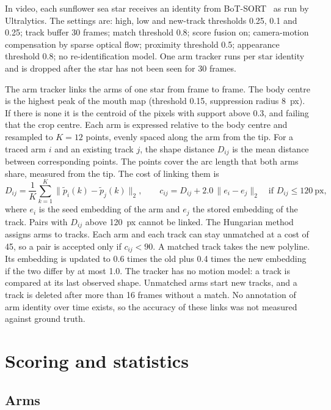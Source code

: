 In video, each sunflower sea star receives an identity from BoT-SORT~\cite{aharon2022botsort} as run by Ultralytics.
The settings are: high, low and new-track thresholds 0.25, 0.1 and 0.25; track buffer 30 frames; match threshold 0.8; score fusion on; camera-motion compensation by sparse optical flow; proximity threshold 0.5; appearance threshold 0.8; no re-identification model.
One arm tracker runs per star identity and is dropped after the star has not been seen for 30 frames.

The arm tracker links the arms of one star from frame to frame.
The body centre is the highest peak of the mouth map (threshold 0.15, suppression radius 8~px).
If there is none it is the centroid of the pixels with support above 0.3, and failing that the crop centre.
Each arm is expressed relative to the body centre and resampled to $K = 12$ points, evenly spaced along the arm from the tip.
For a traced arm $i$ and an existing track $j$, the shape distance $D_{ij}$ is the mean distance between corresponding points.
The points cover the arc length that both arms share, measured from the tip.
The cost of linking them is
\begin{equation}
D_{ij} = \frac{1}{K}\sum_{k=1}^{K}\bigl\lVert \tilde p_i(k)-\tilde p_j(k)\bigr\rVert_2,
\qquad
c_{ij} = D_{ij} + 2.0\,\lVert e_i - e_j\rVert_2 \quad \text{if } D_{ij}\leq 120\ \text{px},
\label{eq:s1assoc}
\end{equation}
where $e_i$ is the seed embedding of the arm and $e_j$ the stored embedding of the track.
Pairs with $D_{ij}$ above 120~px cannot be linked.
The Hungarian method assigns arms to tracks.
Each arm and each track can stay unmatched at a cost of 45, so a pair is accepted only if $c_{ij} < 90$.
A matched track takes the new polyline.
Its embedding is updated to 0.6 times the old plus 0.4 times the new embedding if the two differ by at most 1.0.
The tracker has no motion model: a track is compared at its last observed shape.
Unmatched arms start new tracks, and a track is deleted after more than 16 frames without a match.
No annotation of arm identity over time exists, so the accuracy of these links was not measured against ground truth.

\section*{Scoring and statistics}

\subsection*{Arms}

